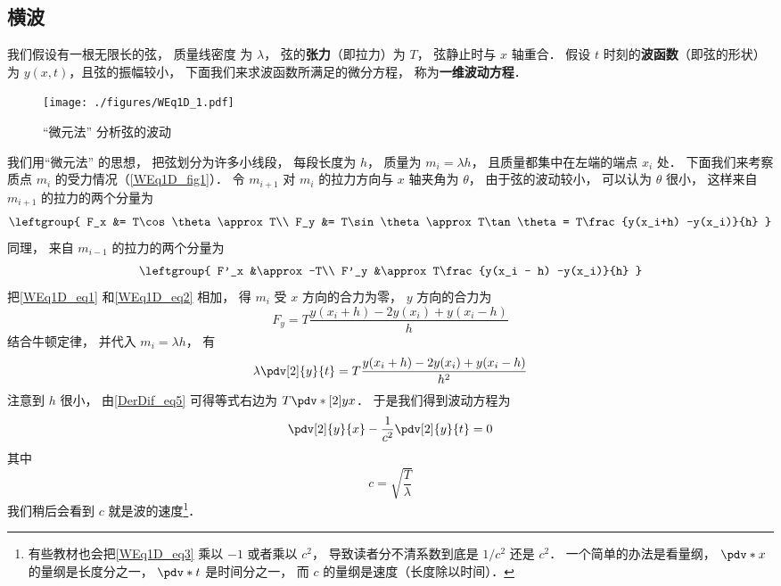 

\subsection{横波}
我们假设有一根无限长的弦， 质量线密度%
为 $\lambda$， 弦的\textbf{张力}（即拉力）为 $T$， 弦静止时与 $x$ 轴重合． 假设 $t$ 时刻的\textbf{波函数}（即弦的形状）为 $y(x, t)$，且弦的振幅较小， 下面我们来求波函数所满足的微分方程， 称为\textbf{一维波动方程}．

\begin{figure}[ht]
\centering
\texttt{[image: ./figures/WEq1D\_1.pdf]}
\caption{“微元法” 分析弦的波动} \label{WEq1D_fig1}
\end{figure}

我们用“微元法” 的思想， 把弦划分为许多小线段， 每段长度为 $h$， 质量为 $m_i = \lambda h$， 且质量都集中在左端的端点 $x_i$ 处． 下面我们来考察质点 $m_i$ 的受力情况（\autoref{WEq1D_fig1}）． 令 $m_{i+1}$ 对 $m_i$ 的拉力方向与 $x$ 轴夹角为 $\theta$， 由于弦的波动较小， 可以认为 $\theta$ 很小， 这样来自 $m_{i+1}$ 的拉力的两个分量为
\begin{equation}\label{WEq1D_eq1}
\leftgroup{
F_x &= T\cos\theta \approx T\\
F_y &= T\sin\theta \approx T\tan\theta = T\frac{y(x_i+h) -y(x_i)}{h}
}\end{equation}
同理， 来自 $m_{i-1}$ 的拉力的两个分量为
\begin{equation}\label{WEq1D_eq2}
\leftgroup{
F'_x &\approx -T\\
F'_y &\approx T\frac{y(x_i - h) -y(x_i)}{h}
}\end{equation}
把\autoref{WEq1D_eq1} 和\autoref{WEq1D_eq2} 相加， 得 $m_i$ 受 $x$ 方向的合力为零， $y$ 方向的合力为
\begin{equation}
F_y = T\frac{y(x_i+h) - 2y(x_i) + y(x_i-h)}{h}
\end{equation}
结合牛顿定律， 并代入 $m_i = \lambda h$， 有
\begin{equation}
\lambda \pdv[2]{y}{t} = T\frac{y(x_i+h) - 2y(x_i) + y(x_i-h)}{h^2}
\end{equation}
注意到 $h$ 很小， 由\autoref{DerDif_eq5} 可得等式右边为 $T\pdv*[2]{y}{x}$． 于是我们得到波动方程为
\begin{equation}\label{WEq1D_eq3}
\pdv[2]{y}{x} - \frac{1}{c^2}\pdv[2]{y}{t} = 0
\end{equation}
其中
\begin{equation}
c = \sqrt{\frac{T}{\lambda}}
\end{equation}
我们稍后会看到 $c$ 就是波的速度\footnote{有些教材也会把\autoref{WEq1D_eq3} 乘以 $-1$ 或者乘以 $c^2$， 导致读者分不清系数到底是 $1/c^2$ 还是 $c^2$． 一个简单的办法是看量纲， $\pdv*{x}$ 的量纲是长度分之一， $\pdv*{t}$ 是时间分之一， 而 $c$ 的量纲是速度（长度除以时间）．}．

